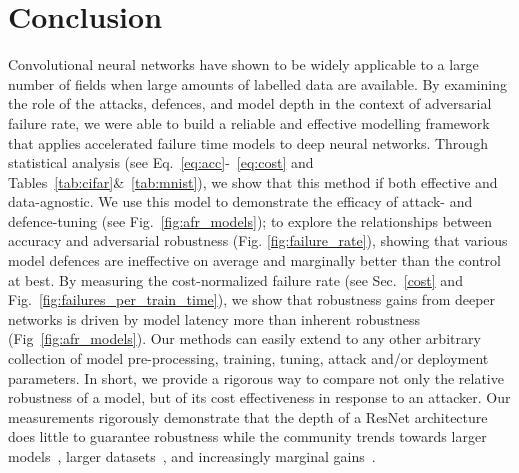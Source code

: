 \section{Conclusion}
Convolutional neural networks have shown to be widely applicable to a large number of fields when large amounts of labelled data are available. By examining the role of the attacks, defences, and model depth in the context of adversarial failure rate, we were able to build a reliable and effective modelling framework that applies accelerated failure time models to deep neural networks. Through statistical analysis (see Eq.~\ref{eq:acc}-~\ref{eq:cost} and Tables~\ref{tab:cifar}\&~\ref{tab:mnist}), we show that this method if both effective and data-agnostic.  We use this model to demonstrate the efficacy of attack- and defence-tuning (see Fig.~\ref{fig:afr_models}); to  explore the relationships between accuracy and adversarial robustness (Fig. \ref{fig:failure_rate}), showing that various model defences are ineffective on average and marginally better than the control at best.
By measuring the cost-normalized failure rate (see Sec.~\ref{cost} and Fig.~\ref{fig:failures_per_train_time}), we show that robustness gains from deeper networks is driven by model latency more than inherent robustness (Fig~\ref{fig:afr_models}). Our methods can easily extend to any other arbitrary collection of model pre-processing, training, tuning, attack and/or deployment parameters. In short, we provide a rigorous way to compare not only the relative robustness of a model, but of its cost effectiveness in response to an attacker. Our measurements rigorously demonstrate  that the depth of a ResNet architecture does little to guarantee robustness while the community trends towards larger models~\cite{desislavov2021compute}, larger datasets~\cite{desislavov2021compute,bailly2022effects}, and increasingly marginal gains~\cite{sun2017revisiting}.
